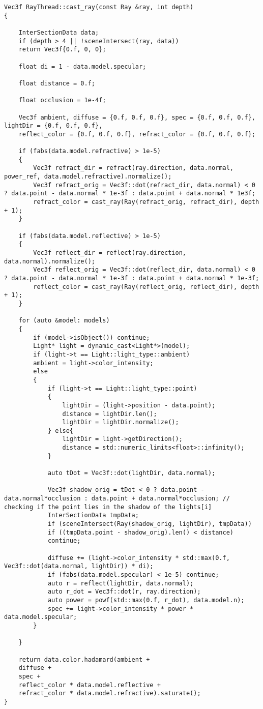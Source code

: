 \begin{lstlisting}[label=lst:lev_mat2,caption= Алгоритм трассировки]
Vec3f RayThread::cast_ray(const Ray &ray, int depth)
{
	
	InterSectionData data;
	if (depth > 4 || !sceneIntersect(ray, data))
	return Vec3f{0.f, 0, 0};
	
	float di = 1 - data.model.specular;
	
	float distance = 0.f;
	
	float occlusion = 1e-4f;
	
	Vec3f ambient, diffuse = {0.f, 0.f, 0.f}, spec = {0.f, 0.f, 0.f}, lightDir = {0.f, 0.f, 0.f},
	reflect_color = {0.f, 0.f, 0.f}, refract_color = {0.f, 0.f, 0.f};
	
	if (fabs(data.model.refractive) > 1e-5)
	{
		Vec3f refract_dir = refract(ray.direction, data.normal, power_ref, data.model.refractive).normalize();
		Vec3f refract_orig = Vec3f::dot(refract_dir, data.normal) < 0 ? data.point - data.normal * 1e-3f : data.point + data.normal * 1e3f;
		refract_color = cast_ray(Ray(refract_orig, refract_dir), depth + 1);
	}
	
	if (fabs(data.model.reflective) > 1e-5)
	{
		Vec3f reflect_dir = reflect(ray.direction, data.normal).normalize();
		Vec3f reflect_orig = Vec3f::dot(reflect_dir, data.normal) < 0 ? data.point - data.normal * 1e-3f : data.point + data.normal * 1e-3f;
		reflect_color = cast_ray(Ray(reflect_orig, reflect_dir), depth + 1);
	}
	
	for (auto &model: models)
	{
		if (model->isObject()) continue;
		Light* light = dynamic_cast<Light*>(model);
		if (light->t == Light::light_type::ambient)
		ambient = light->color_intensity;
		else
		{
			if (light->t == Light::light_type::point)
			{
				lightDir = (light->position - data.point);
				distance = lightDir.len();
				lightDir = lightDir.normalize();
			} else{
				lightDir = light->getDirection();
				distance = std::numeric_limits<float>::infinity();
			}
			
			auto tDot = Vec3f::dot(lightDir, data.normal);
			
			Vec3f shadow_orig = tDot < 0 ? data.point - data.normal*occlusion : data.point + data.normal*occlusion; // checking if the point lies in the shadow of the lights[i]
			InterSectionData tmpData;
			if (sceneIntersect(Ray(shadow_orig, lightDir), tmpData))
			if ((tmpData.point - shadow_orig).len() < distance)
			continue;
			
			diffuse += (light->color_intensity * std::max(0.f, Vec3f::dot(data.normal, lightDir)) * di);
			if (fabs(data.model.specular) < 1e-5) continue;
			auto r = reflect(lightDir, data.normal);
			auto r_dot = Vec3f::dot(r, ray.direction);
			auto power = powf(std::max(0.f, r_dot), data.model.n);
			spec += light->color_intensity * power * data.model.specular;
		}
		
	}
	
	return data.color.hadamard(ambient +
	diffuse +
	spec +
	reflect_color * data.model.reflective +
	refract_color * data.model.refractive).saturate();
}
\end{lstlisting}

